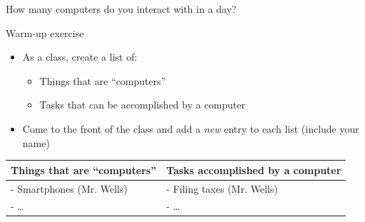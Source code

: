\documentclass[aspectratio=169]{beamer}
\begin{document}
\begin{frame}{How many computers do you interact with in a day?}
\end{frame}


\begin{frame}{Warm-up exercise}
    \begin{itemize}[label=--]
        \item As a class, create a list of:
            \begin{itemize}[label=--,itemsep=5pt]
                \item Things that are ``computers''
                \item Tasks that can be accomplished by a computer
            \end{itemize}
        \item Come to the front of the class and add a \textit{new} entry to each list (include your name)
    \end{itemize}
    \begin{table}
    \centering
        \begin{tabular}{ll}
            \toprule
            \textbf{Things that are ``computers''} & \textbf{Tasks accomplished by a computer} \\
            \midrule
            - Smartphones (Mr. Wells)              & - Filing taxes (Mr. Wells)                           \\
            - \ldots                               & - \ldots                                             \\
        \end{tabular}
    \end{table}   
\end{frame}
\end{document}
